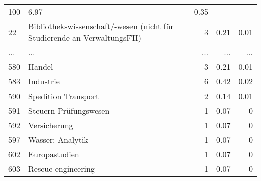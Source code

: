 \begin{longtable}{lXrrr}
          \num{100} &
          \num[round-mode=places,round-precision=2]{6,97} &
          \num[round-mode=places,round-precision=2]{0,35} \\
        22 & \multicolumn{1}{X}{Bibliothekswissenschaft/-wesen (nicht für Studierende an VerwaltungsFH)} & %
          \num{3} &
          \num[round-mode=places,round-precision=2]{0,21} &
          \num[round-mode=places,round-precision=2]{0,01} \\
       ... & ... & ... & ... & ... \\
        580 & \multicolumn{1}{X}{Handel} & %
          \num{3} &
          \num[round-mode=places,round-precision=2]{0,21} &
          \num[round-mode=places,round-precision=2]{0,01} \\

        583 & \multicolumn{1}{X}{Industrie} & %
          \num{6} &
          \num[round-mode=places,round-precision=2]{0,42} &
          \num[round-mode=places,round-precision=2]{0,02} \\

        590 & \multicolumn{1}{X}{Spedition Transport} & %
          \num{2} &
          \num[round-mode=places,round-precision=2]{0,14} &
          \num[round-mode=places,round-precision=2]{0,01} \\

        591 & \multicolumn{1}{X}{Steuern Prüfungswesen} & %
          \num{1} &
          \num[round-mode=places,round-precision=2]{0,07} &
          \num[round-mode=places,round-precision=2]{0} \\

        592 & \multicolumn{1}{X}{Versicherung} & %
          \num{1} &
          \num[round-mode=places,round-precision=2]{0,07} &
          \num[round-mode=places,round-precision=2]{0} \\

        597 & \multicolumn{1}{X}{Wasser: Analytik} & %
          \num{1} &
          \num[round-mode=places,round-precision=2]{0,07} &
          \num[round-mode=places,round-precision=2]{0} \\

        602 & \multicolumn{1}{X}{Europastudien} & %
          \num{1} &
          \num[round-mode=places,round-precision=2]{0,07} &
          \num[round-mode=places,round-precision=2]{0} \\

        603 & \multicolumn{1}{X}{Rescue engineering} & %
          \num{1} &
          \num[round-mode=places,round-precision=2]{0,07} &
          \num[round-mode=places,round-precision=2]{0} \\


\end{longtable}
